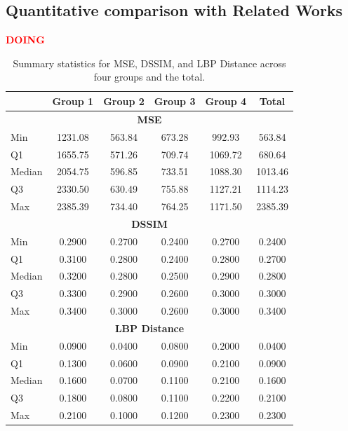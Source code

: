\documentclass{ieeeaccess}
\begin{document}
\subsection{Quantitative comparison with Related Works}
\vspace{5mm} { \textcolor{red} {\textbf{DOING}}}  \vspace{5mm}



\begin{table}[h!]
\centering
\begin{tabular}{|l|c|c|c|c|c|}
\hline
& \textbf{Group 1} & \textbf{Group 2} & \textbf{Group 3} & \textbf{Group 4} & \textbf{Total} \\
\hline
\multicolumn{6}{|c|}{\textbf{MSE}} \\
\hline
Min     & 1231.08 & 563.84 & 673.28 & 992.93 & 563.84 \\
Q1      & 1655.75 & 571.26 & 709.74 & 1069.72 & 680.64 \\
Median  & 2054.75 & 596.85 & 733.51 & 1088.30 & 1013.46 \\
Q3      & 2330.50 & 630.49 & 755.88 & 1127.21 & 1114.23 \\
Max     & 2385.39 & 734.40 & 764.25 & 1171.50 & 2385.39 \\
\hline
\multicolumn{6}{|c|}{\textbf{DSSIM}} \\
\hline
\hline
Min     & 0.2900 & 0.2700 & 0.2400 & 0.2700 & 0.2400 \\
Q1      & 0.3100 & 0.2800 & 0.2400 & 0.2800 & 0.2700 \\
Median  & 0.3200 & 0.2800 & 0.2500 & 0.2900 & 0.2800 \\
Q3      & 0.3300 & 0.2900 & 0.2600 & 0.3000 & 0.3000 \\
Max     & 0.3400 & 0.3000 & 0.2600 & 0.3000 & 0.3400 \\
\hline
\multicolumn{6}{|c|}{\textbf{LBP Distance}} \\
\hline
\hline
Min     & 0.0900 & 0.0400 & 0.0800 & 0.2000 & 0.0400 \\
Q1      & 0.1300 & 0.0600 & 0.0900 & 0.2100 & 0.0900 \\
Median  & 0.1600 & 0.0700 & 0.1100 & 0.2100 & 0.1600 \\
Q3      & 0.1800 & 0.0800 & 0.1100 & 0.2200 & 0.2100 \\
Max     & 0.2100 & 0.1000 & 0.1200 & 0.2300 & 0.2300 \\
\hline
\end{tabular}
\caption{Summary statistics for MSE, DSSIM, and LBP Distance across four groups and the total.}
\label{tab:metrics_summary}
\end{table}
\end{document}
